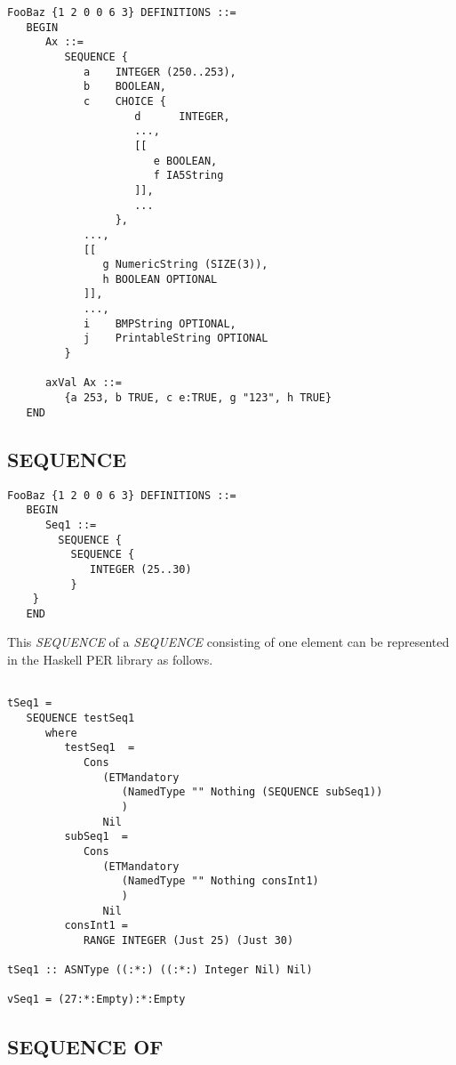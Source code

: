 \documentclass{article}
\begin{document}
\begin{lstlisting}[frame=single]
FooBaz {1 2 0 0 6 3} DEFINITIONS ::=
   BEGIN
      Ax ::= 
         SEQUENCE {
            a    INTEGER (250..253),
            b    BOOLEAN,
            c    CHOICE {
                    d      INTEGER,
                    ...,
                    [[
                       e BOOLEAN,
                       f IA5String
                    ]],
                    ...
                 },
            ...,
            [[
               g NumericString (SIZE(3)),
               h BOOLEAN OPTIONAL
            ]],
            ...,
            i    BMPString OPTIONAL,
            j    PrintableString OPTIONAL
         }

      axVal Ax ::= 
         {a 253, b TRUE, c e:TRUE, g "123", h TRUE}
   END

\end{lstlisting}

\subsection{SEQUENCE}

\begin{lstlisting}[frame=single]
FooBaz {1 2 0 0 6 3} DEFINITIONS ::=
   BEGIN
      Seq1 ::= 
        SEQUENCE {
          SEQUENCE {
             INTEGER (25..30)
          }
	}
   END
\end{lstlisting}

This {\em SEQUENCE} of a {\em SEQUENCE} consisting of one element
can be represented in the Haskell PER library as follows.

\begin{lstlisting}[frame=single]

tSeq1 = 
   SEQUENCE testSeq1 
      where
         testSeq1  = 
            Cons 
               (ETMandatory 
                  (NamedType "" Nothing (SEQUENCE subSeq1))
                  )
               Nil
         subSeq1  = 
            Cons 
               (ETMandatory 
                  (NamedType "" Nothing consInt1)
                  ) 
               Nil
         consInt1 = 
            RANGE INTEGER (Just 25) (Just 30)

tSeq1 :: ASNType ((:*:) ((:*:) Integer Nil) Nil)

vSeq1 = (27:*:Empty):*:Empty

\end{lstlisting}

\subsection{SEQUENCE OF}
\end{document}
